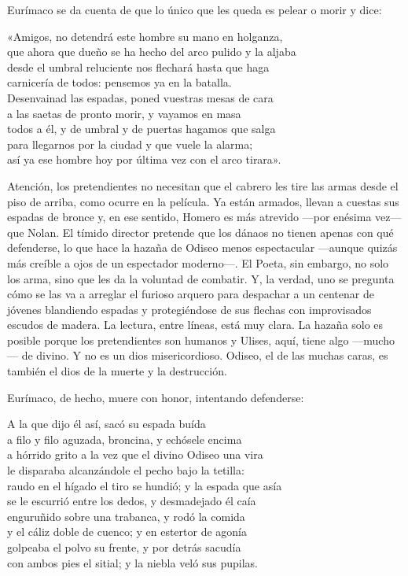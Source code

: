 Eurímaco se da cuenta de que lo único que les queda es pelear o morir y dice:

\begin{versocita}
«Amigos, no detendrá este hombre su mano en holganza,\\
que ahora que dueño se ha hecho del arco pulido y la aljaba\\
desde el umbral reluciente nos flechará hasta que haga\\
carnicería de todos: pensemos ya en la batalla.\\
Desenvainad las espadas, poned vuestras mesas de cara\\
a las saetas de pronto morir, y vayamos en masa\\
todos a él, y de umbral y de puertas hagamos que salga\\
para llegarnos por la ciudad y que vuele la alarma;\\
así ya ese hombre hoy por última vez con el arco tirara».
\end{versocita}

Atención, los pretendientes no necesitan que el cabrero les tire las armas desde el piso de arriba, como ocurre en la película. Ya están armados, llevan a cuestas sus espadas de bronce y, en ese sentido, Homero es más atrevido ---por enésima vez--- que Nolan. El tímido director pretende que los dánaos no tienen apenas con qué defenderse, lo que hace la hazaña de Odiseo menos espectacular ---aunque quizás más creíble a ojos de un espectador moderno---. El Poeta, sin embargo, no solo los arma, sino que les da la voluntad de combatir. Y, la verdad, uno se pregunta cómo se las va a arreglar el furioso arquero para despachar a un centenar de jóvenes blandiendo espadas y protegiéndose de sus flechas con improvisados escudos de madera. La lectura, entre líneas, está muy clara. La hazaña solo es posible porque los pretendientes son humanos y Ulises, aquí, tiene algo ---mucho--- de divino. Y no es un dios misericordioso. Odiseo, el de las muchas caras, es también el dios de la muerte y la destrucción.

Eurímaco, de hecho, muere con honor, intentando defenderse:

\begin{versocita}
A la que dijo él así, sacó su espada buída\\
a filo y filo aguzada, broncina, y echósele encima\\
a hórrido grito a la vez que el divino Odiseo una vira\\
le disparaba alcanzándole el pecho bajo la tetilla:\\
raudo en el hígado el tiro se hundió; y la espada que asía\\
se le escurrió entre los dedos, y desmadejado él caía\\
enguruñido sobre una trabanca, y rodó la comida\\
y el cáliz doble de cuenco; y en estertor de agonía\\
golpeaba el polvo su frente, y por detrás sacudía\\
con ambos pies el sitial; y la niebla veló sus pupilas.
\end{versocita}

